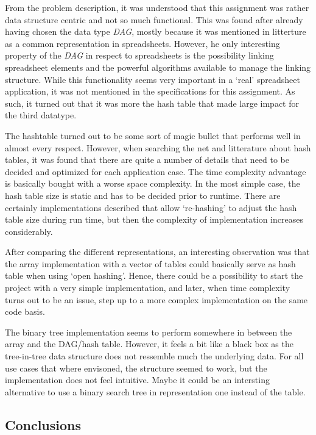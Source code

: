 \documentclass[a4paper,11pt,twoside]{article}
\begin{document}
From the problem description, it was understood that this assignment
was rather data structure centric and not so much functional. This was
found after already having chosen the data type \textit{DAG}, mostly 
because it was mentioned in litterture as a common representation in
spreadsheets. However, he only interesting property of the
\textit{DAG} in respect to spreadsheets is the possibility linking
spreadsheet elements and the powerful algorithms available to manage
the linking structure. While this functionality seems very important
in a `real' spreadsheet application, it was  not mentioned in the
specifications for this assignment. As such, it turned out that it was
more the hash table that made large impact for the third datatype.

The hashtable turned out to be some sort of magic bullet that performs
well in almost every respect. However, when searching the net
and litterature about hash tables, it was found that there are quite a
number of details that need to be decided and optimized for each
application case. The time complexity advantage is basically bought
with a worse space complexity. In the most simple case, the hash table
size is static and has to be decided prior to runtime. There are certainly
implementations described that allow `re-hashing' to adjust the hash
table size during run time, but then the complexity of implementation
increases considerably.

After comparing the different representations, an interesting
observation was that the array implementation with a vector of tables
could basically serve as hash table when using `open hashing'. Hence,
there could be a possibility to start the project with a very simple
implementation, and later, when time complexity turns out to be an
issue, step up to a more complex implementation on the same
code basis. 

The binary tree implementation seems to perform somewhere in between
the array and the DAG/hash table. However, it feels a bit like a black
box as the tree-in-tree  data structure does not ressemble much the
underlying data. For all use cases that where envisoned, the structure
seemed to work, but the implementation does not feel
intuitive. Maybe it could be an intersting alternative to use a binary
search tree in representation one instead of the table.

\subsection{Conclusions}
\end{document}
